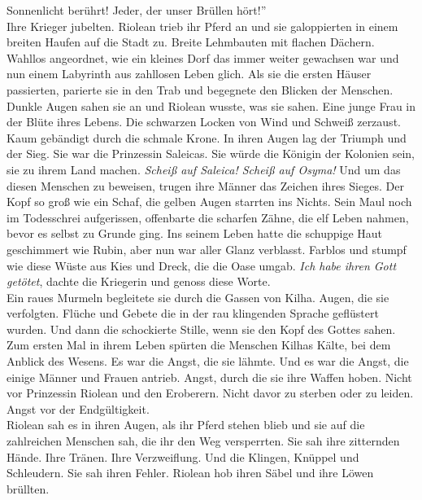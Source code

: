 Sonnenlicht berührt! Jeder, der unser Brüllen hört!''\\
Ihre Krieger jubelten. Riolean trieb ihr Pferd an und sie galoppierten in einem breiten Haufen 
auf die Stadt zu. Breite Lehmbauten mit flachen Dächern. Wahllos angeordnet, wie ein kleines 
Dorf das immer weiter gewachsen war und nun einem Labyrinth aus zahllosen Leben glich. Als sie die 
ersten Häuser passierten, parierte sie in den Trab und begegnete den Blicken der Menschen. Dunkle 
Augen sahen sie an und Riolean wusste, was sie sahen. Eine junge Frau in der Blüte ihres Lebens. 
Die schwarzen Locken von Wind und Schweiß zerzaust. Kaum gebändigt durch die schmale Krone. In ihren 
Augen lag der Triumph und der Sieg. Sie war die Prinzessin Saleicas. Sie würde die Königin der 
Kolonien sein, sie zu ihrem Land machen. \textit{Scheiß auf Saleica! Scheiß auf Osyma!}
Und um das diesen Menschen zu beweisen, trugen ihre Männer das Zeichen ihres Sieges. Der Kopf so 
groß wie ein Schaf, die gelben Augen starrten ins Nichts. Sein Maul noch im Todesschrei 
aufgerissen, offenbarte die scharfen Zähne, die elf Leben nahmen, bevor es selbst zu Grunde ging. 
Ins seinem Leben hatte die schuppige Haut geschimmert wie Rubin, aber nun war aller Glanz 
verblasst. Farblos und stumpf wie diese Wüste aus Kies und Dreck, die die Oase umgab.
\textit{Ich habe ihren Gott getötet}, dachte die Kriegerin und genoss diese Worte.\\
Ein raues Murmeln begleitete sie durch die Gassen von Kilha. Augen, die sie verfolgten. Flüche und 
Gebete die in der rau klingenden Sprache geflüstert wurden. Und dann die schockierte Stille, wenn 
sie den Kopf des Gottes sahen. Zum ersten Mal in ihrem Leben spürten die Menschen Kilhas Kälte, bei 
dem Anblick des Wesens. Es war die Angst, die sie lähmte. Und es war die Angst, die einige Männer 
und Frauen antrieb. Angst, durch die sie ihre Waffen hoben. Nicht vor Prinzessin Riolean und den 
Eroberern. Nicht davor zu sterben oder zu leiden. Angst vor der Endgültigkeit.\\
Riolean sah es in ihren Augen, als ihr Pferd stehen blieb und sie auf die zahlreichen Menschen sah, 
die ihr den Weg versperrten. Sie sah ihre zitternden Hände. Ihre Tränen. Ihre Verzweiflung. Und die 
Klingen, Knüppel und Schleudern. Sie sah ihren Fehler. Riolean hob ihren Säbel und ihre Löwen 
brüllten.